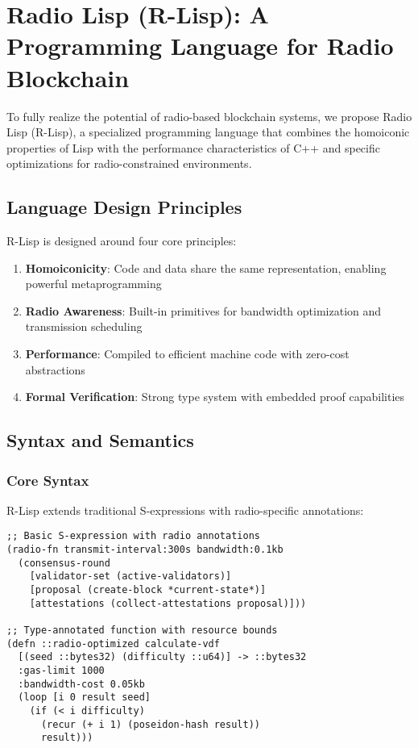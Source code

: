 \documentclass[11pt,a4paper]{article}
\begin{document}
\section{Radio Lisp (R-Lisp): A Programming Language for Radio Blockchain}

To fully realize the potential of radio-based blockchain systems, we propose Radio Lisp (R-Lisp), a specialized programming language that combines the homoiconic properties of Lisp with the performance characteristics of C++ and specific optimizations for radio-constrained environments.

\subsection{Language Design Principles}

R-Lisp is designed around four core principles:

\begin{enumerate}
\item \textbf{Homoiconicity}: Code and data share the same representation, enabling powerful metaprogramming
\item \textbf{Radio Awareness}: Built-in primitives for bandwidth optimization and transmission scheduling
\item \textbf{Performance}: Compiled to efficient machine code with zero-cost abstractions
\item \textbf{Formal Verification}: Strong type system with embedded proof capabilities
\end{enumerate}

\subsection{Syntax and Semantics}

\subsubsection{Core Syntax}

R-Lisp extends traditional S-expressions with radio-specific annotations:

\begin{verbatim}
;; Basic S-expression with radio annotations
(radio-fn transmit-interval:300s bandwidth:0.1kb 
  (consensus-round 
    [validator-set (active-validators)]
    [proposal (create-block *current-state*)]
    [attestations (collect-attestations proposal)]))

;; Type-annotated function with resource bounds
(defn ::radio-optimized calculate-vdf 
  [(seed ::bytes32) (difficulty ::u64)] -> ::bytes32
  :gas-limit 1000
  :bandwidth-cost 0.05kb
  (loop [i 0 result seed]
    (if (< i difficulty)
      (recur (+ i 1) (poseidon-hash result))
      result)))
\end{verbatim}
\end{document}
